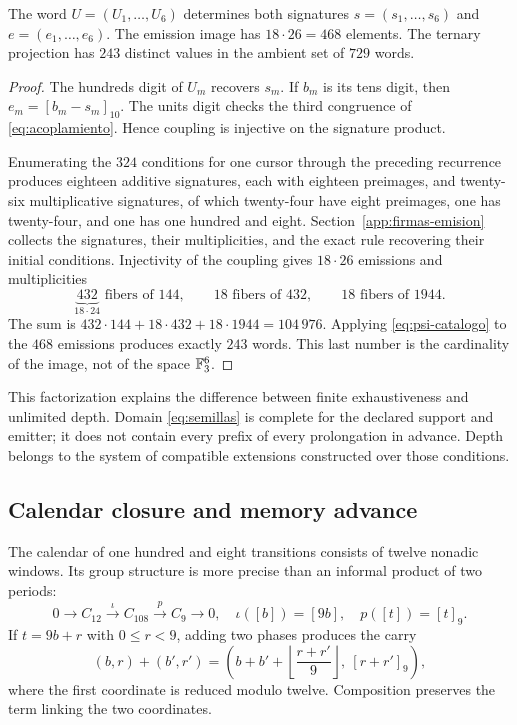\begin{proposition}
The word \(U=(U_1,\ldots,U_6)\) determines both signatures \(s=(s_1,\ldots,s_6)\) and \(e=(e_1,\ldots,e_6)\). The emission image has \(18\cdot26=468\) elements. The ternary projection has \(243\) distinct values in the ambient set of \(729\) words.
\end{proposition}
\begin{proof}
The hundreds digit of \(U_m\) recovers \(s_m\). If \(b_m\) is its tens digit, then \(e_m=[b_m-s_m]_{10}\). The units digit checks the third congruence of \eqref{eq:acoplamiento}. Hence coupling is injective on the signature product.

Enumerating the \(324\) conditions for one cursor through the preceding recurrence produces eighteen additive signatures, each with eighteen preimages, and twenty-six multiplicative signatures, of which twenty-four have eight preimages, one has twenty-four, and one has one hundred and eight. Section~\ref{app:firmas-emision} collects the signatures, their multiplicities, and the exact rule recovering their initial conditions. Injectivity of the coupling gives \(18\cdot26\) emissions and multiplicities
\[
 \underbrace{432}_{18\cdot24}\text{ fibers of }144,
 \qquad18\text{ fibers of }432,
 \qquad18\text{ fibers of }1944.
\]
The sum is \(432\cdot144+18\cdot432+18\cdot1944=104\,976\). Applying \eqref{eq:psi-catalogo} to the \(468\) emissions produces exactly \(243\) words. This last number is the cardinality of the image, not of the space \(\mathbb F_3^6\).
\end{proof}

This factorization explains the difference between finite exhaustiveness and unlimited depth. Domain \eqref{eq:semillas} is complete for the declared support and emitter; it does not contain every prefix of every prolongation in advance. Depth belongs to the system of compatible extensions constructed over those conditions.

\subsection{Calendar closure and memory advance}

The calendar of one hundred and eight transitions consists of twelve nonadic windows. Its group structure is more precise than an informal product of two periods:
\begin{equation}
 0\longrightarrow C_{12}\xrightarrow{\iota}C_{108}
 \xrightarrow{p}C_9\longrightarrow0,
 \quad\iota([b])=[9b],\quad p([t])=[t]_9.
 \label{eq:extension108}
\end{equation}
If \(t=9b+r\) with \(0\le r<9\), adding two phases produces the carry
\[
 (b,r)+(b',r')=
 \left(b+b'+\left\lfloor\frac{r+r'}9\right\rfloor,\ [r+r']_9\right),
\]
where the first coordinate is reduced modulo twelve. Composition preserves the term linking the two coordinates.

